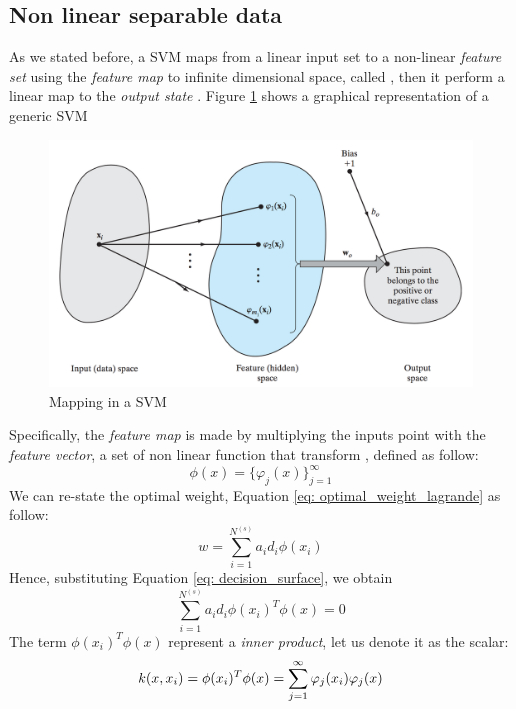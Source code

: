 \documentclass[11pt]{article}
\begin{document}
\subsection{Non linear separable data}
As we stated before, a SVM maps from a linear input set to a non-linear \emph{feature set} using the  \emph{feature map} to infinite dimensional space, called , then it perform a linear map to the \emph{output state} . Figure \ref{fig: SVM} shows a graphical representation of a generic SVM
\begin{figure}[H]
\centering
\includegraphics[scale=0.4]{images/SVM}
\caption{Mapping in a SVM}
\label{fig: SVM}
\end{figure}
Specifically, the \emph{feature map} is made by multiplying the inputs point with the \emph{feature vector}, a set of non linear function that transform , defined as follow:
\begin{equation}
\phi(x) = \{\varphi_j(x) \}^{\infty}_{j=1}
\label{eq: feature_map}
\end{equation}
We can re-state the optimal weight, Equation \ref{eq: optimal_weight_lagrande} as follow:
\begin{equation}
w = \sum^{N^{(s)}}_{i = 1}a_id_i\phi(x_i)	
\label{eq: optimal_weight_kerlen}
\end{equation}
Hence, substituting Equation \ref{eq: decision_surface}, we obtain
\begin{equation}
\sum^{N^{(s)}}_{i = 1}a_id_i\phi(x_i)^T\phi(x) = 0
\label{eq: optimal_hyperplane_feature}
\end{equation}
The term $\phi(x_i)^T\phi(x)$ represent a \emph{inner product}, let us denote it as the scalar:
\begin{equation}
\label{eq: kernel}
k(x, x_i) = \phi(x_i)^T\phi(x)  \\
= \sum^{\infty}_{j=1} \varphi_j(x_i)\varphi_j(x)
\end{equation}
\end{document}
